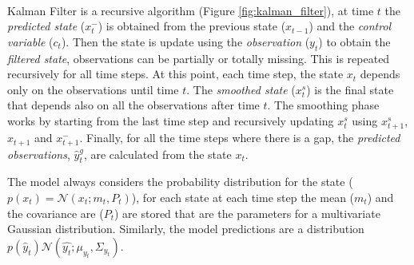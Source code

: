 \documentclass{article}
\newcommand{\norm}[3]{\mathcal{N}\left(#1; #2, #3\right)} %
\begin{document}
\paragraph{} Kalman Filter is a recursive algorithm (Figure \ref{fig:kalman_filter}), at time $t$ the \textit{predicted state} ($x^-_t$) is obtained from the previous state ($x_{t-1}$) and the \textit{control variable} ($c_t$). Then the state is update using the \textit{observation} ($y_t$) to obtain the \textit{filtered state}, observations can be partially or totally missing. This is repeated recursively for all time steps. At this point, each time step, the state $x_t$ depends only on the observations until time $t$. The \textit{smoothed state} ($x^s_t$) is the final state that depends also on all the observations after time $t$. The smoothing phase works by starting from the last time step and recursively updating $x^s_t$ using $x^s_{t+1}$, $x_{t+1}$ and $x^-_{t+1}$.
Finally, for all the time steps where there is a gap, the \textit{predicted observations}, $\hat{y}^g_t$, are calculated from the state $x_t$.

The model always considers the probability distribution for the state ($p(x_t) = \norm{x_t}{m_t}{P_t}$), for each state at each time step the mean ($m_t$) and the covariance are ($P_t$) are stored that are the parameters for a multivariate Gaussian distribution. Similarly, the model predictions are a distribution $p(\hat{y}_t) \norm{\hat{y_t}}{\mu_{y_t}}{\Sigma_{y_t}}$.
\end{document}
